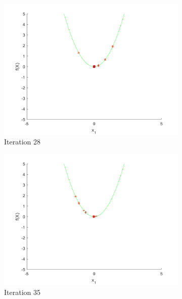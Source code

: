 \begin{figure}
\begin{subfigure}[b]{0.4\textwidth}
    \includegraphics[width=\textwidth]{img/smpl/circ/loa-iter-28}
    \caption{Iteration 28}
    \label{fig:s1-iter-4}
  \end{subfigure}
  \begin{subfigure}[b]{0.4\textwidth}
    \includegraphics[width=\textwidth]{img/smpl/circ/loa-iter-35}
    \caption{Iteration 35}
    \label{fig:s1-iter-5}
  \end{subfigure}
  \begin{subfigure}[b]{0.4\textwidth}

\end{subfigure}
\end{figure}
